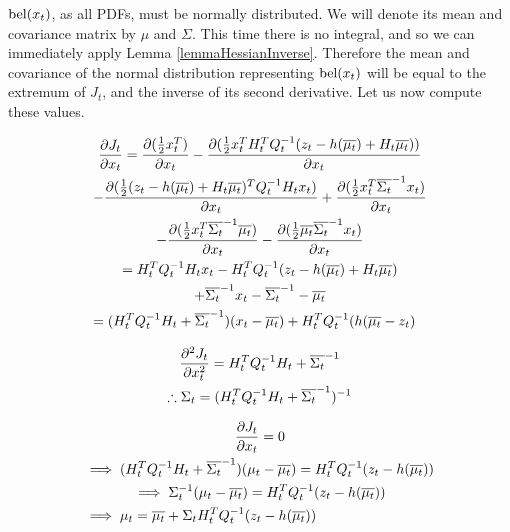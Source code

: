 \(\mathrm{bel}(x_t)\), as all PDFs, must be normally distributed. We will denote its mean and covariance matrix by \(\mu\) and \(\Sigma\). This time there is no integral, and so we can immediately apply Lemma \ref{lemmaHessianInverse}. 
Therefore the mean and covariance of the normal distribution representing \(\mathrm{bel}(x_t)\) will be equal to the extremum of \(J_t\), and the inverse of its second derivative. Let us now compute these values.

\begin{multline*}
\frac{\partial J_t}{\partial x_t} = \frac{\partial (\frac{1}{2} x_t^T )}{\partial x_t} - \frac{\partial (\frac{1}{2} x_t^T H_t^T Q_t^{-1} (z_t - h(\overline{\mu_t}) + H_t \overline{\mu_t}))}{\partial x_t} \\
- \frac{\partial (\frac{1}{2} (z_t - h(\overline{\mu_t}) + H_t \overline{\mu_t})^T Q_t^{-1} H_t x_t)}{\partial x_t} + \frac{\partial (\frac{1}{2} x_t^T \overline{\Sigma_t}^{-1} x_t)}{\partial x_t} \\
- \frac{\partial (\frac{1}{2} x_t^T \overline{\Sigma_t}^{-1} \overline{\mu_t})}{\partial x_t} - \frac{\partial (\frac{1}{2} \overline{\mu_t} \overline{\Sigma_t}^{-1} x_t )}{\partial x_t} \\
= H_t^T Q_t^{-1} H_t x_t - H_t^T Q_t^{-1} (z_t - h(\overline{\mu_t}) + H_t \overline{\mu_t}) \\
+ \overline{\Sigma_t}^{-1} x_t - \overline{\Sigma_t}^{-1} - \overline{\mu_t} \\
= (H_t^T Q_t^{-1} H_t + \overline{\Sigma_t}^{-1}) (x_t - \overline{\mu_t}) + H_t^TQ_t^{-1}(h(\overline{\mu_t} - z_t) \hfill
\end{multline*}

\begin{multline*}
\frac{\partial^2 J_t}{\partial x_t^2} = H_t^T Q_t^{-1} H_t + \overline{\Sigma_t}^{-1} \\
\therefore \Sigma_t = (H_t^T Q_t^{-1} H_t + \overline{\Sigma_t}^{-1})^{-1} \hfill
\end{multline*}

\begin{multline*}
\frac{\partial J_t}{\partial x_t} = 0 \\
\implies (H_t^T Q_t^{-1} H_t + \overline{\Sigma_t}^{-1}) (\mu_t - \overline{\mu_t}) = H_t^TQ_t^{-1}(z_t - h(\overline{\mu_t})) \\
\implies \Sigma_t^{-1} (\mu_t - \overline{\mu_t}) = H_t^TQ_t^{-1}(z_t - h(\overline{\mu_t})) \\
\implies \mu_t = \overline{\mu_t} + \Sigma_t H_t^TQ_t^{-1}(z_t - h(\overline{\mu_t})) \hfill
\end{multline*}

